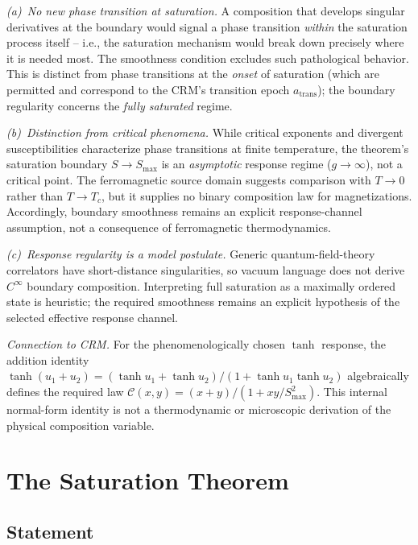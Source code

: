 \documentclass[aps,prd,twocolumn,superscriptaddress,nofootinbib]{revtex4-2}
\begin{document}
\textit{(a)~No new phase transition at saturation.} A composition that develops singular derivatives at the boundary would signal a phase transition \textit{within} the saturation process itself -- i.e., the saturation mechanism would break down precisely where it is needed most. The smoothness condition excludes such pathological behavior. This is distinct from phase transitions at the \textit{onset} of saturation (which are permitted and correspond to the CRM's transition epoch $a_{\mathrm{trans}}$); the boundary regularity concerns the \textit{fully saturated} regime.

\textit{(b)~Distinction from critical phenomena.} While critical exponents and divergent susceptibilities characterize phase transitions at finite temperature, the theorem's saturation boundary $S \to S_{\max}$ is an \textit{asymptotic} response regime ($g \to \infty$), not a critical point. The ferromagnetic source domain suggests comparison with $T\to0$ rather than $T\to T_c$, but it supplies no binary composition law for magnetizations. Accordingly, boundary smoothness remains an explicit response-channel assumption, not a consequence of ferromagnetic thermodynamics.

\textit{(c)~Response regularity is a model postulate.} Generic quantum-field-theory correlators have short-distance singularities, so vacuum language does not derive $C^\infty$ boundary composition. Interpreting full saturation as a maximally ordered state is heuristic; the required smoothness remains an explicit hypothesis of the selected effective response channel.

\textit{Connection to CRM.} For the phenomenologically chosen $\tanh$ response, the addition identity $\tanh(u_1 + u_2) = (\tanh u_1 + \tanh u_2)/(1 + \tanh u_1 \tanh u_2)$ algebraically defines the required law $\mathcal{C}(x,y) = (x + y)/(1 + xy/S_{\max}^2)$. This internal normal-form identity is not a thermodynamic or microscopic derivation of the physical composition variable.


\section{The Saturation Theorem}
\label{sec:theorem}

\subsection{Statement}
\end{document}
